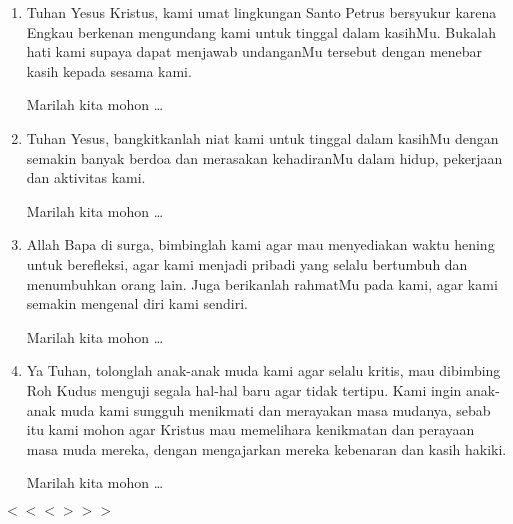 \documentclass[12pt,a4paper,twoside]{article}
\author{Yohanes Suyanto}
\begin{document}
\onehalfspacing
\begin{Large}
\end{Large}
\begin{enumerate}
\item Tuhan Yesus Kristus, kami umat lingkungan Santo Petrus bersyukur karena Engkau berkenan mengundang kami untuk
tinggal dalam kasihMu. Bukalah hati kami supaya dapat menjawab undanganMu tersebut dengan menebar kasih
kepada sesama kami. 

Marilah kita mohon \dots

\item Tuhan Yesus, bangkitkanlah niat kami untuk tinggal dalam kasihMu dengan semakin banyak berdoa dan
merasakan kehadiranMu dalam hidup, pekerjaan dan aktivitas kami. 

Marilah kita mohon \dots

\item Allah Bapa di surga, bimbinglah kami agar mau menyediakan waktu hening untuk berefleksi, agar kami menjadi pribadi yang selalu bertumbuh dan menumbuhkan orang lain. Juga berikanlah rahmatMu pada kami, agar kami semakin mengenal diri kami sendiri. 

Marilah kita mohon \dots

\item Ya Tuhan, tolonglah anak-anak muda kami agar selalu kritis, mau dibimbing Roh Kudus
menguji segala hal-hal baru agar tidak tertipu.
Kami ingin anak-anak muda kami sungguh menikmati dan merayakan masa mudanya,
sebab itu kami mohon agar Kristus mau memelihara kenikmatan dan perayaan masa muda mereka,
dengan mengajarkan mereka kebenaran dan kasih hakiki.  

Marilah kita mohon \dots
\end{enumerate}
\begin{center}$<<<>>>$\end{center}
\end{document}
